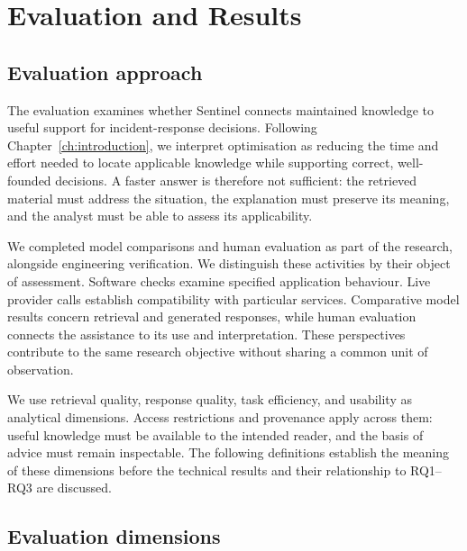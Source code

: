 \chapter{Evaluation and Results}\label{ch:evaluation}

\section{Evaluation approach}

The evaluation examines whether Sentinel connects maintained knowledge to useful support for incident-response decisions. Following Chapter~\ref{ch:introduction}, we interpret optimisation as reducing the time and effort needed to locate applicable knowledge while supporting correct, well-founded decisions. A faster answer is therefore not sufficient: the retrieved material must address the situation, the explanation must preserve its meaning, and the analyst must be able to assess its applicability.

We completed model comparisons and human evaluation as part of the research, alongside engineering verification. We distinguish these activities by their object of assessment. Software checks examine specified application behaviour. Live provider calls establish compatibility with particular services. Comparative model results concern retrieval and generated responses, while human evaluation connects the assistance to its use and interpretation. These perspectives contribute to the same research objective without sharing a common unit of observation.

We use retrieval quality, response quality, task efficiency, and usability as analytical dimensions. Access restrictions and provenance apply across them: useful knowledge must be available to the intended reader, and the basis of advice must remain inspectable. The following definitions establish the meaning of these dimensions before the technical results and their relationship to RQ1--RQ3 are discussed.


\section{Evaluation dimensions}

